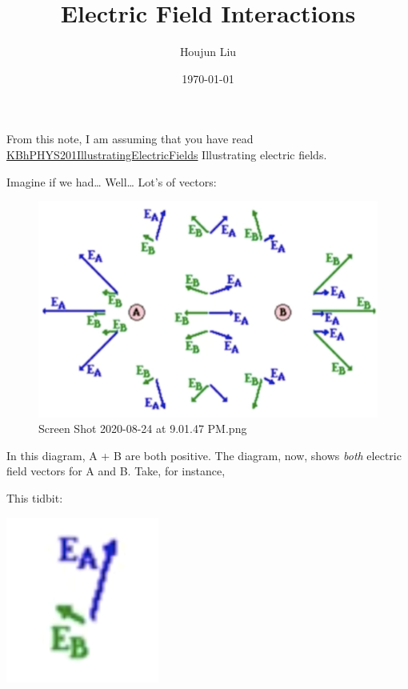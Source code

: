 \documentclass[letterpaper]{article}
\author{Houjun Liu}
\date{\today}
\title{Electric Field Interactions}
\renewcommand\maketitle{}
\begin{document}
\maketitle
From this note, I am assuming that you have read
\href{KBhPHYS201IllustratingElectricFields.org}{KBhPHYS201IllustratingElectricFields}
Illustrating electric fields.

Imagine if we had\ldots{} Well\ldots{} Lot's of vectors:

\begin{figure}[htbp]
\centering
\includegraphics[width=.9\linewidth]{./Screen Shot 2020-08-24 at 9.01.47 PM.png}
\caption{Screen Shot 2020-08-24 at 9.01.47 PM.png}
\end{figure}

In this diagram, A + B are both positive. The diagram, now, shows \emph{both}
electric field vectors for A and B. Take, for instance,

This tidbit: \begin{center}
\includegraphics[width=.9\linewidth]{./Screen Shot 2020-08-24 at 9.04.52 PM.png}
\end{center}
\end{document}
